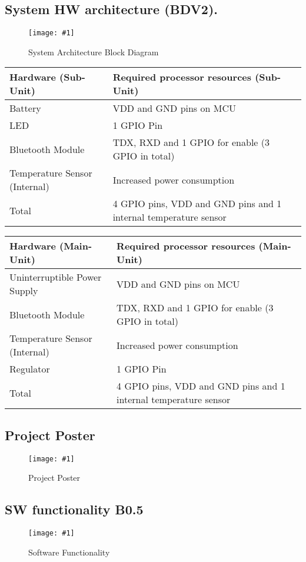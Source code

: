 \documentclass[12pt]{article} \usepackage{jeep} \usepackage{unicode}
\newcommand\createfigure[2]{
  \begin{figure}[H]
    \centering \texttt{[image: \#1]}
    \caption{#2}
  \end{figure}}
\begin{document}
\subsection{System HW architecture (BDV2).}
\createfigure{../Figures/system-architecture-block-diagram.jpg}{System
  Architecture Block Diagram}
\newpage
\begin{center}
  \begin{tabularx}{\textwidth}{|X|X|}
    \hline
    Hardware (Sub-Unit) & Required processor resources (Sub-Unit)\\
    \hline
    Battery & VDD and GND pins on MCU\\
    \hline
    LED & 1 GPIO Pin\\
    \hline
    Bluetooth Module & TDX, RXD and 1 GPIO for enable (3 GPIO in total)\\
    \hline
    Temperature Sensor (Internal) & Increased power consumption\\
    \hline
    Total & 4 GPIO pins, VDD and GND pins and 1 internal temperature sensor\\
    \hline
  \end{tabularx}
\end{center}
\begin{center}
  \begin{tabularx}{\textwidth}{|X|X|}
    \hline
    Hardware (Main-Unit) & Required processor resources (Main-Unit)\\
    \hline
    Uninterruptible Power Supply & VDD and GND pins on MCU\\
    \hline
    Bluetooth Module & TDX, RXD and 1 GPIO for enable (3 GPIO in total)\\
    \hline
    Temperature Sensor (Internal) & Increased power consumption\\
    \hline
    Regulator & 1 GPIO Pin\\
    \hline
    Total & 4 GPIO pins, VDD and GND pins and 1 internal temperature sensor\\
    \hline
  \end{tabularx}
\end{center}
\subsection{Project Poster}
\createfigure{../Figures/project-poster.jpg}{Project Poster}
\subsection{SW functionality B0.5}
\createfigure{../Figures/SW functionality B0.5.jpg}{Software Functionality}
\end{document}
